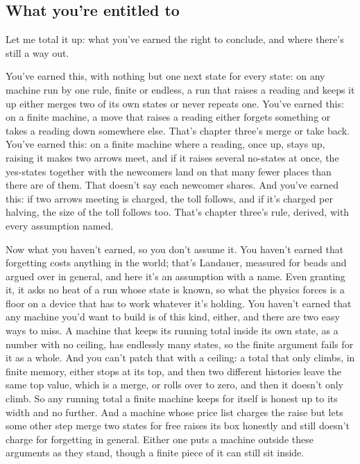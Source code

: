 \documentclass[11pt,twoside]{article}
\theoremstyle{thielethm}
\theoremstyle{thieledef}
\theoremstyle{thieledef}
\theoremstyle{thieledef}
\theoremstyle{thielethm}
\theoremstyle{thieleobs}
\theoremstyle{thielethm}
\begin{document}
\subsection{What you're entitled to}

Let me total it up: what you've earned the right to conclude, and where there's still a way out.

You've earned this, with nothing but one next state for every state: on any machine run by one rule, finite or endless, a run that raises a reading and keeps it up either merges two of its own states or never repeats one. You've earned this: on a finite machine, a move that raises a reading either forgets something or takes a reading down somewhere else. That's chapter three's merge or take back. You've earned this: on a finite machine where a reading, once up, stays up, raising it makes two arrows meet, and if it raises several no-states at once, the yes-states together with the newcomers land on that many fewer places than there are of them. That doesn't say each newcomer shares. And you've earned this: if two arrows meeting is charged, the toll follows, and if it's charged per halving, the size of the toll follows too. That's chapter three's rule, derived, with every assumption named.

Now what you haven't earned, so you don't assume it. You haven't earned that forgetting costs anything in the world; that's Landauer, measured for beads and argued over in general, and here it's an assumption with a name. Even granting it, it asks no heat of a run whose state is known, so what the physics forces is a floor on a device that has to work whatever it's holding. You haven't earned that any machine you'd want to build is of this kind, either, and there are two easy ways to miss. A machine that keeps its running total inside its own state, as a number with no ceiling, has endlessly many states, so the finite argument fails for it as a whole. And you can't patch that with a ceiling: a total that only climbs, in finite memory, either stops at its top, and then two different histories leave the same top value, which is a merge, or rolls over to zero, and then it doesn't only climb. So any running total a finite machine keeps for itself is honest up to its width and no further. And a machine whose price list charges the raise but lets some other step merge two states for free raises its box honestly and still doesn't charge for forgetting in general. Either one puts a machine outside these arguments as they stand, though a finite piece of it can still sit inside.
\end{document}
